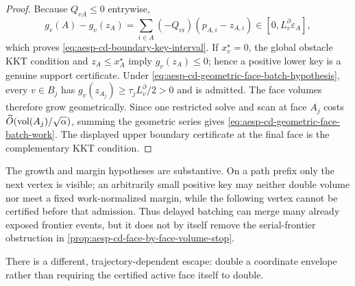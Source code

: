 \begin{proof}
Because $Q_{vA}\leq0$ entrywise,
\begin{equation*}
 g_v(A)-g_v(z_A)
 =\sum_{i\in A}(-Q_{vi})(p_{A,i}-z_{A,i})
 \in[0,L_v^\partial\varepsilon_A],
\end{equation*}
which proves \cref{eq:aesp-cd-boundary-key-interval}.  If $x_v^\star=0$,
the global obstacle KKT condition and $z_A\leq x_A^\star$ imply
$g_v(z_A)\leq0$; hence a positive lower key is a genuine support
certificate.  Under
\cref{eq:aesp-cd-geometric-face-batch-hypothesis}, every $v\in B_j$ has
$g_v(z_{A_j})\geq\tau_jL_v^\partial/2>0$ and is admitted.  The face volumes
therefore grow geometrically.  Since one restricted solve and scan at face
$A_j$ costs
$\widetilde O(\operatorname{vol}(A_j)/\sqrt\alpha)$, summing the geometric series gives
\cref{eq:aesp-cd-geometric-face-batch-work}.  The displayed upper boundary
certificate at the final face is the complementary KKT condition.
\end{proof}

The growth and margin hypotheses are substantive.  On a path prefix only
the next vertex is visible; an arbitrarily small positive key may neither
double volume nor meet a fixed work-normalized margin, while the following
vertex cannot be certified before that admission.  Thus delayed batching
can merge many already exposed frontier events, but it does not by itself
remove the serial-frontier obstruction in
\cref{prop:aesp-cd-face-by-face-volume-stop}.

There is a different, trajectory-dependent escape: double a coordinate
envelope rather than requiring the certified active face itself to double.

